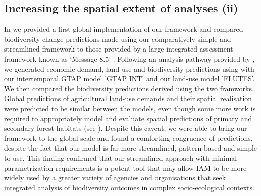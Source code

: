 \subsection{Increasing the spatial extent of analyses (ii)}
In  we provided a first global implementation of our framework and compared biodiversity change predictions made using our comparatively simple and streamlined framework to those provided by a large integrated assessment framework known as ‘Message 8.5’ \citep{riahi_rcp_2011}. Following an analysis pathway provided by \citet{newbold_global_2015}, we generated economic demand, land use and biodiversity predictions using with our intertemporal GTAP model ’GTAP INT’ and our land-use model ’FLUTES’. We then compared the biodiversity predictions derived using the two framworks. Global predictions of agricultural land-use demands and their spatial realisation were predicted to be similar between the models, even though some more work is required to appropriately model and evaluate spatial predictions of primary and secondary forest habitats (see ). Despite  this caveat, we were able to bring our framework to the global scale and found a comforting congruence of predictions, despite the fact that our model is far more streamlined, pattern-based and simple to use. This finding confirmed that our streamlined approach with minimal parametrization requirements is a potent tool that may allow IAM to be more widely used by a greater variety of agencies and organisations that seek integrated analysis of biodiversity outcomes in complex socio-ecological contexts.


